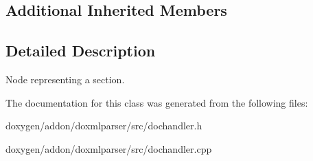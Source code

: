 \subsection*{Additional Inherited Members}


\subsection{Detailed Description}
Node representing a section. 



The documentation for this class was generated from the following files\+:\begin{DoxyCompactItemize}
\item 
doxygen/addon/doxmlparser/src/dochandler.\+h\item 
doxygen/addon/doxmlparser/src/dochandler.\+cpp\end{DoxyCompactItemize}
